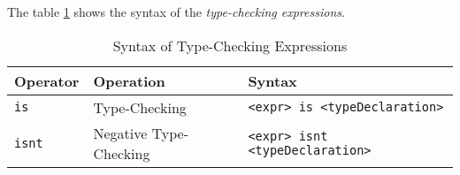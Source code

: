 The table \ref{tab:type-checking-syntax} shows the syntax of
the \emph{type-checking expressions}.

\begin{table}[H]
\centering
\begin{tabular}
{ l l l }
\hline
Operator & Operation & Syntax \\
\hline
\verb|is| & Type-Checking & \verb|<expr> is <typeDeclaration> | \\
\verb|isnt| & Negative Type-Checking & \verb|<expr> isnt <typeDeclaration>| \\
\end{tabular}
\caption{Syntax of Type-Checking Expressions}
\label{tab:type-checking-syntax}
\end{table}
